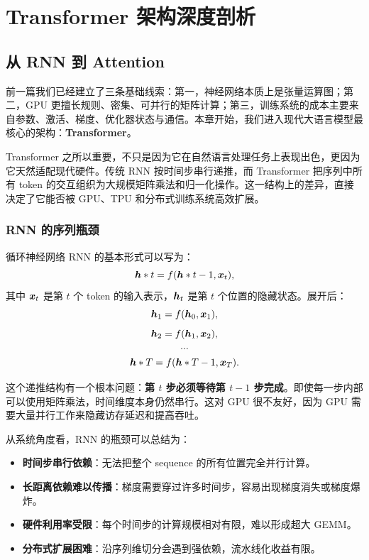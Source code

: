 \chapter{Transformer 架构深度剖析}
\label{chap:transformer}

\section{从 RNN 到 Attention}
\label{sec:from-rnn-to-attention}

前一篇我们已经建立了三条基础线索：第一，神经网络本质上是张量运算图；第二，GPU 更擅长规则、密集、可并行的矩阵计算；第三，训练系统的成本主要来自参数、激活、梯度、优化器状态与通信。本章开始，我们进入现代大语言模型最核心的架构：\textbf{Transformer}。

Transformer 之所以重要，不只是因为它在自然语言处理任务上表现出色，更因为它天然适配现代硬件。传统 RNN 按时间步串行递推，而 Transformer 把序列中所有 token 的交互组织为大规模矩阵乘法和归一化操作。这一结构上的差异，直接决定了它能否被 GPU、TPU 和分布式训练系统高效扩展。

\subsection{RNN 的序列瓶颈}
\label{subsec:rnn-sequential-bottleneck}

循环神经网络 RNN 的基本形式可以写为：
\[
\bm{h}*t=f(\bm{h}*{t-1},\bm{x}_t),
\]
其中 $\bm{x}_t$ 是第 $t$ 个 token 的输入表示，$\bm{h}_t$ 是第 $t$ 个位置的隐藏状态。展开后：
\[
\bm{h}_1=f(\bm{h}_0,\bm{x}_1),
\]
\[
\bm{h}_2=f(\bm{h}_1,\bm{x}_2),
\]
\[
\cdots
\]
\[
\bm{h}*T=f(\bm{h}*{T-1},\bm{x}_T).
\]

这个递推结构有一个根本问题：\textbf{第 $t$ 步必须等待第 $t-1$ 步完成}。即使每一步内部可以使用矩阵乘法，时间维度本身仍然串行。这对 GPU 很不友好，因为 GPU 需要大量并行工作来隐藏访存延迟和提高吞吐。

从系统角度看，RNN 的瓶颈可以总结为：

\begin{itemize}
\item \textbf{时间步串行依赖}：无法把整个 sequence 的所有位置完全并行计算。
\item \textbf{长距离依赖难以传播}：梯度需要穿过许多时间步，容易出现梯度消失或梯度爆炸。
\item \textbf{硬件利用率受限}：每个时间步的计算规模相对有限，难以形成超大 GEMM。
\item \textbf{分布式扩展困难}：沿序列维切分会遇到强依赖，流水线化收益有限。
\end{itemize}

